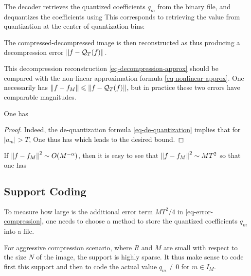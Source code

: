 The decoder retrieves the quantized coefficients $q_m$ from the binary file, and dequantizes the coefficients using
This corresponds to retrieving the value from quantization at the center of quantization bins:
\begin{center}
\end{center}

The compressed-decompressed image is then reconstructed as
thus producing a decompression error $\left\| f-\mathcal{Q}_T(f) \right\|$.

This decompression reconstruction \eqref{eq-decompression-approx} should be compared with the non-linear approximation formula \eqref{eq-nonlinear-approx}. One necessarily has $\left\| f-f_M \right\| \leqslant \left\| f-\mathcal{Q}_T(f) \right\|$, but in practice these two errors have comparable magnitudes. 

\begin{prop}
	One has 
\end{prop}

\begin{proof}
Indeed, the de-quantization formula \eqref{eq-de-quantization} implies that for $|a_m|>T$,
One thus has
which leads to the desired bound.
\end{proof}

If $\left\| f-f_M \right\|^2 \sim O(M^{-\alpha})$, then it is easy to see that $\left\| f-f_M \right\|^2 \sim M T^2$ so that one has 

\subsection{Support Coding}
\label{subsec-support-coding}

To measure how large is the additional error term $M T^2/4$ in \eqref{eq-error-compression}, one needs to choose a method to store the quantized coefficients $q_m$ into a file. 

For aggressive compression scenario, where $R$ and $M$ are small with respect to the size $N$ of the image, the support 
is highly sparse. It thus make sense to code first this support and then to code the actual value $q_m \neq 0$ for $m \in I_M$.

